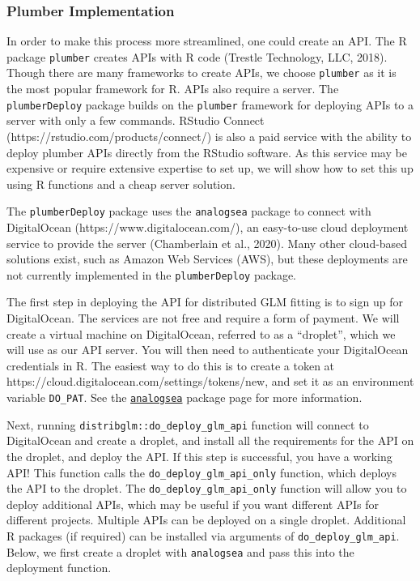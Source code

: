 \documentclass[]{elsarticle} %
\begin{document}
\hypertarget{plumber-implementation}{%
\subsubsection{Plumber Implementation}\label{plumber-implementation}}

In order to make this process more streamlined, one could create an API. The R package \texttt{plumber} creates APIs with R code (Trestle Technology, LLC, 2018). Though there are many frameworks to create APIs, we choose \texttt{plumber} as it is the most popular framework for R. APIs also require a server. The \texttt{plumberDeploy} package builds on the \texttt{plumber} framework for deploying APIs to a server with only a few commands. RStudio Connect (https://rstudio.com/products/connect/) is also a paid service with the ability to deploy plumber APIs directly from the RStudio software. As this service may be expensive or require extensive expertise to set up, we will show how to set this up using R functions and a cheap server solution.

The \texttt{plumberDeploy} package uses the \texttt{analogsea} package to connect with DigitalOcean (https://www.digitalocean.com/), an easy-to-use cloud deployment service to provide the server (Chamberlain et al., 2020). Many other cloud-based solutions exist, such as Amazon Web Services (AWS), but these deployments are not currently implemented in the \texttt{plumberDeploy} package.

The first step in deploying the API for distributed GLM fitting is to sign up for DigitalOcean. The services are not free and require a form of payment. We will create a virtual machine on DigitalOcean, referred to as a ``droplet'', which we will use as our API server. You will then need to authenticate your DigitalOcean credentials in R. The easiest way to do this is to create a token at https://cloud.digitalocean.com/settings/tokens/new, and set it as an environment variable \texttt{DO\_PAT}. See the \href{https://github.com/sckott/analogsea}{\texttt{analogsea}} package page for more information.

Next, running \texttt{distribglm::do\_deploy\_glm\_api} function will connect to DigitalOcean and create a droplet, and install all the requirements for the API on the droplet, and deploy the API. If this step is successful, you have a working API! This function calls the \texttt{do\_deploy\_glm\_api\_only} function, which deploys the API to the droplet. The \texttt{do\_deploy\_glm\_api\_only} function will allow you to deploy additional APIs, which may be useful if you want different APIs for different projects. Multiple APIs can be deployed on a single droplet. Additional R packages (if required) can be installed via arguments of \texttt{do\_deploy\_glm\_api}. Below, we first create a droplet with \texttt{analogsea} and pass this into the deployment function.
\end{document}

